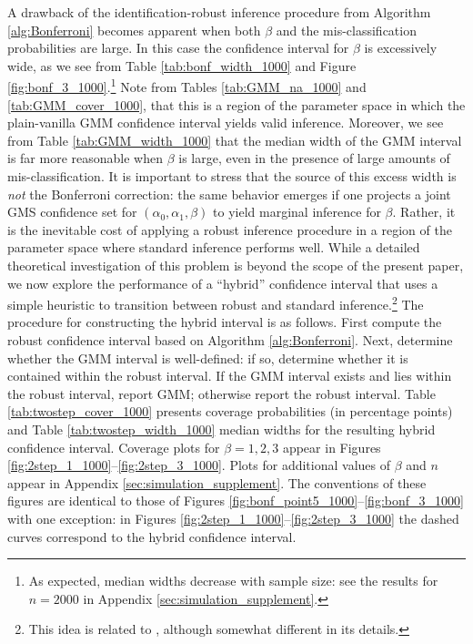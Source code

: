 A drawback of the identification-robust inference procedure from Algorithm \ref{alg:Bonferroni} becomes apparent when both $\beta$ and the mis-classification probabilities are large.
In this case the confidence interval for $\beta$ is excessively wide, as we see from Table \ref{tab:bonf_width_1000} and Figure \ref{fig:bonf_3_1000}.\footnote{As expected, median widths decrease with sample size: see the results for $n = 2000$ in Appendix \ref{sec:simulation_supplement}.}
Note from Tables \ref{tab:GMM_na_1000} and \ref{tab:GMM_cover_1000}, that this is a region of the parameter space in which the plain-vanilla GMM confidence interval yields valid inference.
Moreover, we see from Table \ref{tab:GMM_width_1000} that the median width of the GMM interval is far more reasonable when $\beta$ is large, even in the presence of large amounts of mis-classification.
It is important to stress that the source of this excess width is \emph{not} the Bonferroni correction: the same behavior emerges if one projects a joint GMS confidence set for $(\alpha_0, \alpha_1, \beta)$ to yield marginal inference for $\beta$.
Rather, it is the inevitable cost of applying a robust inference procedure in a region of the parameter space where standard inference performs well.
While a detailed theoretical investigation of this problem is beyond the scope of the present paper, we now explore the performance of a ``hybrid'' confidence interval that uses a simple heuristic to transition between robust and standard inference.\footnote{This idea is related to \cite{andrews2016valid}, although somewhat different in its details.}
The procedure for constructing the hybrid interval is as follows.
First compute the robust confidence interval based on Algorithm \ref{alg:Bonferroni}.
Next, determine whether the GMM interval is well-defined: if so, determine whether it is contained within the robust interval.
If the GMM interval exists and lies within the robust interval, report GMM; otherwise report the robust interval.
Table \ref{tab:twostep_cover_1000} presents coverage probabilities (in percentage points) and Table \ref{tab:twostep_width_1000} median widths for the resulting hybrid confidence interval.
Coverage plots for $\beta = 1, 2, 3$ appear in Figures \ref{fig:2step_1_1000}--\ref{fig:2step_3_1000}.
Plots for additional values of $\beta$ and $n$ appear in Appendix \ref{sec:simulation_supplement}.
The conventions of these figures are identical to those of Figures \ref{fig:bonf_point5_1000}--\ref{fig:bonf_3_1000} with one exception: in Figures \ref{fig:2step_1_1000}--\ref{fig:2step_3_1000} the dashed curves correspond to the hybrid confidence interval.

